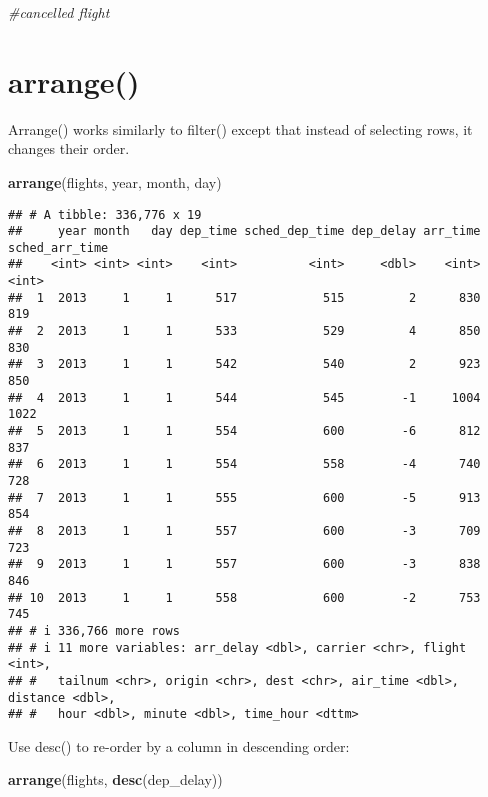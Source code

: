 \documentclass[
]{article}
\newenvironment{Shaded}{\begin{snugshade}}{\end{snugshade}}
\newcommand{\CommentTok}[1]{\textcolor[rgb]{0.56,0.35,0.01}{\textit{#1}}}
\newcommand{\FunctionTok}[1]{\textcolor[rgb]{0.13,0.29,0.53}{\textbf{#1}}}
\newcommand{\NormalTok}[1]{#1}
\begin{document}
\begin{Shaded}
\begin{Highlighting}[]
 \CommentTok{\#cancelled flight}
\end{Highlighting}
\end{Shaded}

\hypertarget{arrange}{%
\section{arrange()}\label{arrange}}

Arrange() works similarly to filter() except that instead of selecting
rows, it changes their order.

\begin{Shaded}
\begin{Highlighting}[]
\FunctionTok{arrange}\NormalTok{(flights, year, month, day)}
\end{Highlighting}
\end{Shaded}

\begin{verbatim}
## # A tibble: 336,776 x 19
##     year month   day dep_time sched_dep_time dep_delay arr_time sched_arr_time
##    <int> <int> <int>    <int>          <int>     <dbl>    <int>          <int>
##  1  2013     1     1      517            515         2      830            819
##  2  2013     1     1      533            529         4      850            830
##  3  2013     1     1      542            540         2      923            850
##  4  2013     1     1      544            545        -1     1004           1022
##  5  2013     1     1      554            600        -6      812            837
##  6  2013     1     1      554            558        -4      740            728
##  7  2013     1     1      555            600        -5      913            854
##  8  2013     1     1      557            600        -3      709            723
##  9  2013     1     1      557            600        -3      838            846
## 10  2013     1     1      558            600        -2      753            745
## # i 336,766 more rows
## # i 11 more variables: arr_delay <dbl>, carrier <chr>, flight <int>,
## #   tailnum <chr>, origin <chr>, dest <chr>, air_time <dbl>, distance <dbl>,
## #   hour <dbl>, minute <dbl>, time_hour <dttm>
\end{verbatim}

Use desc() to re-order by a column in descending order:

\begin{Shaded}
\begin{Highlighting}[]
\FunctionTok{arrange}\NormalTok{(flights, }\FunctionTok{desc}\NormalTok{(dep\_delay))}
\end{Highlighting}
\end{Shaded}
\end{document}
